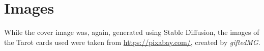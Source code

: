 \section{Images}
While the cover image was, again, generated using Stable Diffusion,
	the images of the Tarot cards used were taken from \url{https://pixabay.com/}, created by \emph{giftedMG}.
